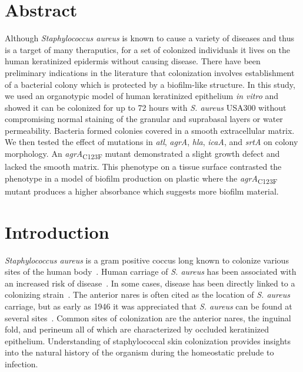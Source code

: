 \documentclass[10pt,letterpaper]{article}
\begin{document}
\section*{Abstract}
Although \textit{Staphylococcus aureus} is known to cause a variety of diseases and thus is a target of many theraputics, for a set of colonized individuals it lives on the human keratinized epidermis without causing disease.
There have been preliminary indications in the literature that colonization involves establishment of a bacterial colony which is protected by a biofilm-like structure.
In this study, we used an organotypic model of human keratinized epithelium \textit{in vitro} and showed it can be colonized for up to 72 hours with \textit{S. aureus} USA300 without compromising normal staining of the granular and suprabasal layers or water permeability.
Bacteria formed colonies covered in a smooth extracellular matrix.
We then tested the effect of mutations in \textit{atl}, \textit{agrA}, \textit{hla}, \textit{icaA}, and \textit{srtA} on colony morphology.
An \textit{agrA}\textsubscript{C123F} mutant demonstrated a slight growth defect and lacked the smooth matrix.
This phenotype on a tissue surface contrasted the phenotype in a model of biofilm production on plastic where the \textit{agrA}\textsubscript{C123F} mutant produces a higher absorbance which suggests more biofilm material.


\linenumbers

\section*{Introduction}

\textit{Staphylococcus aureus} is a gram positive coccus long known to colonize various sites of the human body~\cite{miko_high_2012,williams_healthy_1963,mermel_methicillin-resistant_2011}.
Human carriage of \textit{S. aureus} has been associated with an increased risk of disease~\cite{XXX}.
In some cases, disease has been directly linked to a colonizing strain~\cite{von_eiff_nasal_2001, toshkova_significance_2001}.
The anterior nares is often cited as the location of \textit{S. aureus} carriage, but as early as 1946 it was appreciated that \textit{S. aureus} can be found at several sites~\cite{williams_skin_1946}.
Common sites of colonization are the anterior nares, the inguinal fold, and perineum all of which are characterized by occluded keratinized epithelium.
Understanding of staphylococcal skin colonization provides insights into the natural history of the organism during the homeostatic prelude to infection.
\end{document}
